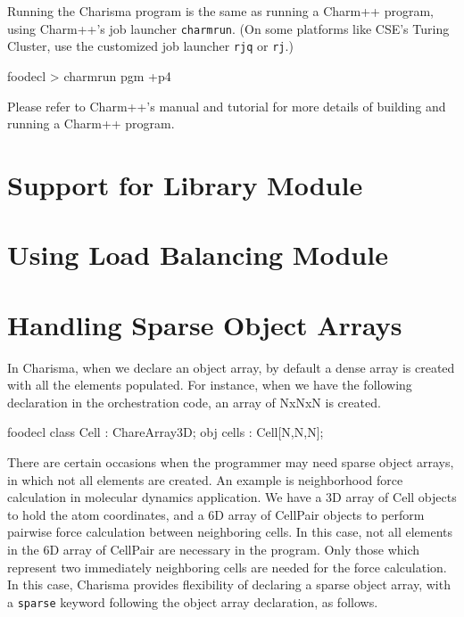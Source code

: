 \documentclass[10pt]{article}
\def\smallfbox#1{{\small {\fbox{#1}}}}
\def\code#1{{\small {\tt {#1}}}}
\begin{document}
Running the Charisma program is the same as running a Charm++ program, using
Charm++'s job launcher \code{charmrun}. (On some platforms like CSE's Turing 
Cluster, use the customized job launcher \code{rjq} or \code{rj}.) 

\begin{SaveVerbatim}{foodecl}
    > charmrun pgm +p4
\end{SaveVerbatim}
\smallfbox{\BUseVerbatim{foodecl}}

Please refer to Charm++'s manual and tutorial for more details of building 
and running a Charm++ program. 

\section{Support for Library Module}
\label{sec:module}


\section{Using Load Balancing Module}
\label{sec:ldb}


\section{Handling Sparse Object Arrays}
\label{sec:sparse}

In Charisma, when we declare an object array, by default a dense array is
created with all the elements populated. For instance, when we have the
following declaration in the orchestration code, an array of NxNxN is created. 
\begin{SaveVerbatim}{foodecl}
    class Cell : ChareArray3D;
    obj cells : Cell[N,N,N];
\end{SaveVerbatim}
\smallfbox{\BUseVerbatim{foodecl}}

There are certain occasions when the programmer may need sparse object arrays,
in which not all elements are created. An example is neighborhood force
calculation in molecular dynamics application. We have a 3D array of Cell
objects to hold the atom coordinates, and a 6D array of CellPair objects to
perform pairwise force calculation between neighboring cells. In this case, not
all elements in the 6D array of CellPair are necessary in the program. Only
those which represent two immediately neighboring cells are needed for the
force calculation. In this case, Charisma provides flexibility of declaring a
sparse object array, with a \code{sparse} keyword following the object array
declaration, as follows.
\end{document}
